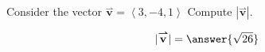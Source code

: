 \documentclass{ximera}
\author{Bart Snapp}
\begin{document}
\begin{exercise}
  Consider the vector $\overset{\boldsymbol{\rightharpoonup}}{\mathbf{v}} = \left\langle 3,-4,1 \right\rangle$ Compute $|\overset{\boldsymbol{\rightharpoonup}}{\mathbf{v}}|$.
  \begin{prompt}
    \[
    |\overset{\boldsymbol{\rightharpoonup}}{\mathbf{v}}|= \answer{\sqrt{26}}
    \]
  \end{prompt}
\end{exercise}
\end{document}
